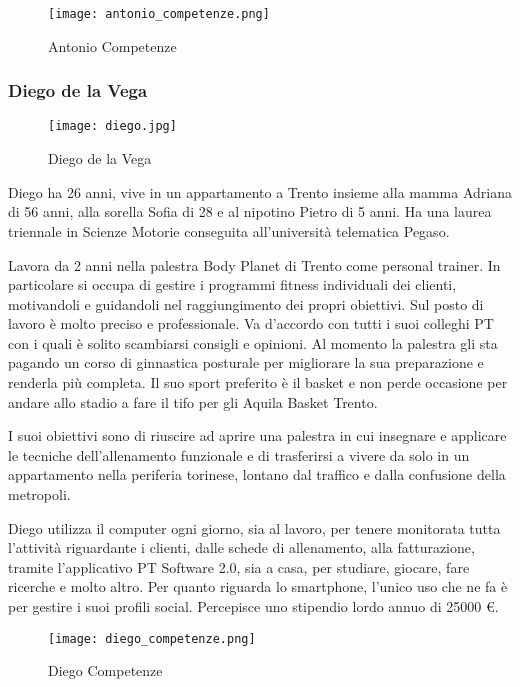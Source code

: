\documentclass[12pt,italian,]{report}
\begin{document}
\begin{figure}
\centering
\texttt{[image: antonio\_competenze.png]}
\caption{Antonio Competenze}
\end{figure}

\hypertarget{diego-de-la-vega-1}{%
\subsubsection{Diego de la Vega}\label{diego-de-la-vega-1}}

\begin{figure}
\centering
\texttt{[image: diego.jpg]}
\caption{Diego de la Vega}
\end{figure}

Diego ha 26 anni, vive in un appartamento a Trento insieme alla mamma
Adriana di 56 anni, alla sorella Sofia di 28 e al nipotino Pietro di 5
anni. Ha una laurea triennale in Scienze Motorie conseguita
all'università telematica Pegaso.

Lavora da 2 anni nella palestra Body Planet di Trento come personal
trainer. In particolare si occupa di gestire i programmi fitness
individuali dei clienti, motivandoli e guidandoli nel raggiungimento dei
propri obiettivi. Sul posto di lavoro è molto preciso e professionale.
Va d'accordo con tutti i suoi colleghi PT con i quali è solito
scambiarsi consigli e opinioni. Al momento la palestra gli sta pagando
un corso di ginnastica posturale per migliorare la sua preparazione e
renderla più completa. Il suo sport preferito è il basket e non perde
occasione per andare allo stadio a fare il tifo per gli Aquila Basket
Trento.

I suoi obiettivi sono di riuscire ad aprire una palestra in cui
insegnare e applicare le tecniche dell'allenamento funzionale e di
trasferirsi a vivere da solo in un appartamento nella periferia
torinese, lontano dal traffico e dalla confusione della metropoli.

Diego utilizza il computer ogni giorno, sia al lavoro, per tenere
monitorata tutta l'attività riguardante i clienti, dalle schede di
allenamento, alla fatturazione, tramite l'applicativo PT Software 2.0,
sia a casa, per studiare, giocare, fare ricerche e molto altro. Per
quanto riguarda lo smartphone, l'unico uso che ne fa è per gestire i
suoi profili social. Percepisce uno stipendio lordo annuo di 25000 €.

\begin{figure}
\centering
\texttt{[image: diego\_competenze.png]}
\caption{Diego Competenze}
\end{figure}
\end{document}
